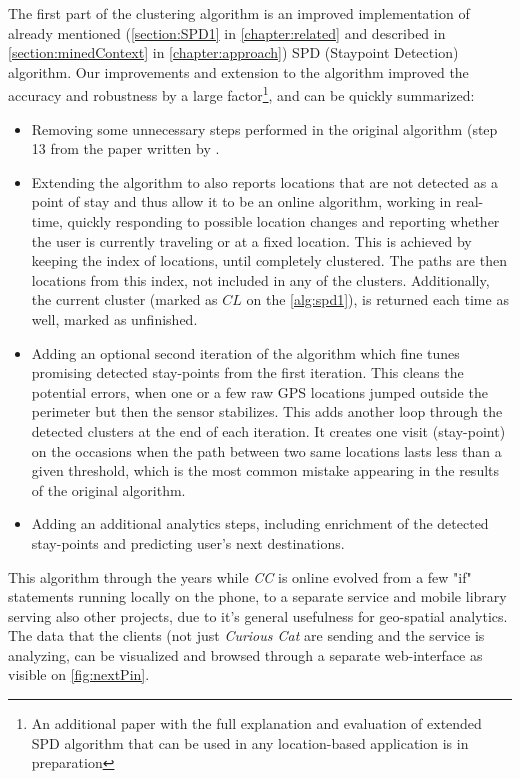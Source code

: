 The first part of the clustering algorithm is an improved implementation of
already mentioned (\autoref{section:SPD1} in \autoref{chapter:related} and
described in \autoref{section:minedContext} in \autoref{chapter:approach})
SPD (Staypoint Detection) algorithm\parencite{Kang2005}. Our improvements
and extension to the algorithm\parencite{Kazic2017} improved the accuracy and 
robustness by a
large factor\footnote{An additional paper with the full explanation and 
evaluation of 
extended SPD algorithm that can be used in any location-based application is 
in preparation}, and can be quickly summarized:
\begin{itemize}
\item Removing some unnecessary steps performed in the original algorithm (step
13 from the paper written by \textcite{Kang2005}.
\item Extending the algorithm to also reports locations that are not detected
as a point of stay and thus allow it to be an online algorithm, working in
real-time, quickly responding to possible location changes and reporting 
whether the user is currently traveling or at a fixed location. This is achieved
by keeping the index of locations, until completely clustered. The paths
are then locations from this index, not included in any of the clusters. 
Additionally, the current cluster (marked as $CL$ on the \autoref{alg:spd1}),
is returned each time as well, marked as unfinished.
\item Adding an optional second iteration of the algorithm which fine tunes
promising detected stay-points from the first iteration. This cleans the 
potential errors, when one or a few raw GPS locations jumped outside the 
perimeter but then the sensor stabilizes. This adds another loop through
the detected clusters at the end of each iteration. It creates one visit
(stay-point) on the occasions when the path between two same locations lasts 
less than a given threshold, which is the most common mistake appearing in the
results of the original algorithm.
\item Adding an additional analytics steps, including enrichment of the detected
stay-points and predicting user's next destinations.
\end{itemize}

This algorithm through the years while \emph{CC} is online evolved from a few
"if" statements running locally on the phone, to a separate service and mobile
library serving also other projects, due to it's general usefulness for 
geo-spatial analytics. The data that the clients (not just \emph{Curious Cat}
are sending and the service is analyzing, can be visualized and browsed through
a separate web-interface as visible on \autoref{fig:nextPin}.

